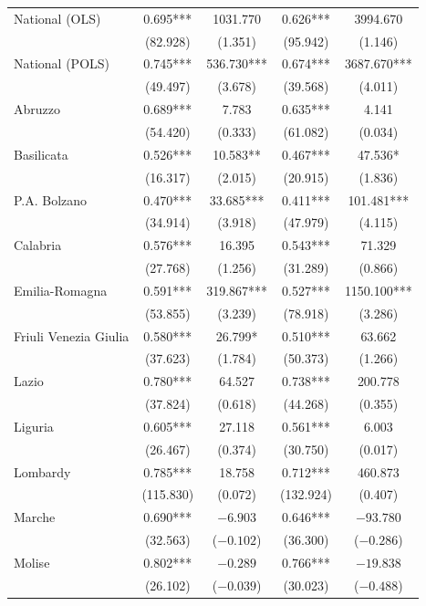 \documentclass[12pt]{article}
\begin{document}
\begin{longtable}{@{}lcccc@{}}
        National (OLS) & 0.695*** & 1031.770 & 0.626*** & 3994.670 \\ 
         & (82.928) & (1.351) & (95.942) & (1.146) \\ 
        National (POLS) & 0.745*** & 536.730*** & 0.674*** & 3687.670*** \\ 
         & (49.497) & (3.678) & (39.568) & (4.011) \\ 
        Abruzzo & 0.689*** & 7.783 & 0.635*** & 4.141 \\ 
         & (54.420) & (0.333) & (61.082) & (0.034) \\ 
        Basilicata & 0.526*** & 10.583** & 0.467*** & 47.536* \\ 
         & (16.317) & (2.015) & (20.915) & (1.836) \\ 
        P.A. Bolzano & 0.470*** & 33.685*** & 0.411*** & 101.481*** \\ 
         & (34.914) & (3.918) & (47.979) & (4.115) \\ 
        Calabria & 0.576*** & 16.395 & 0.543*** & 71.329 \\ 
         & (27.768) & (1.256) & (31.289) & (0.866) \\ 
        Emilia-Romagna & 0.591*** & 319.867*** & 0.527*** & 1150.100*** \\ 
         & (53.855) & (3.239) & (78.918) & (3.286) \\ 
        Friuli Venezia Giulia & 0.580*** & 26.799* & 0.510*** & 63.662 \\ 
         & (37.623) & (1.784) & (50.373) & (1.266) \\ 
        Lazio & 0.780*** & 64.527 & 0.738*** & 200.778 \\ 
         & (37.824) & (0.618) & (44.268) & (0.355) \\ 
        Liguria & 0.605*** & 27.118 & 0.561*** & 6.003 \\ 
         & (26.467) & (0.374) & (30.750) & (0.017) \\ 
        Lombardy & 0.785*** & 18.758 & 0.712*** & 460.873 \\ 
         & (115.830) & (0.072) & (132.924) & (0.407) \\ 
        Marche & 0.690*** & $-6.903$ & 0.646*** & $-93.780$ \\ 
         & (32.563) & ($-0.102$) & (36.300) & ($-0.286$) \\ 
        Molise & 0.802*** & $-0.289$ & 0.766*** & $-19.838$ \\ 
         & (26.102) & ($-0.039$) & (30.023) & ($-0.488$) \\ 

\end{longtable}
\end{document}
